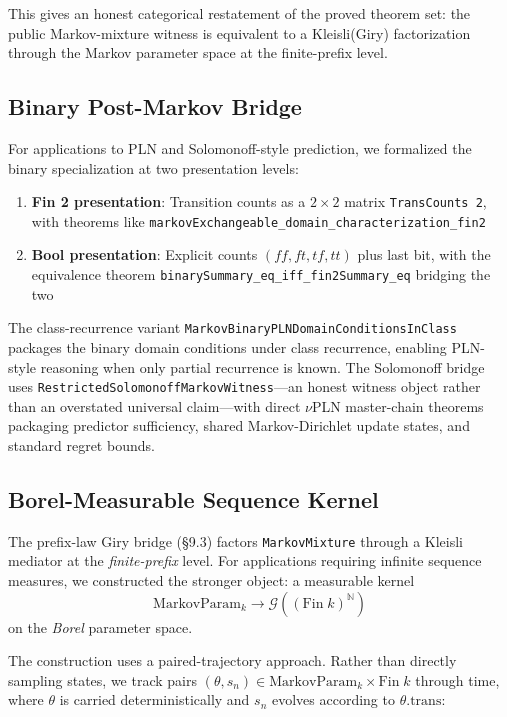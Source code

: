 \documentclass[11pt,a4paper]{article}
\theoremstyle{definition}
\begin{document}
This gives an honest categorical restatement of the proved theorem set:
the public Markov-mixture witness is equivalent to a Kleisli(Giry)
factorization through the Markov parameter space at the finite-prefix level.

\subsection{Binary Post-Markov Bridge}

For applications to PLN and Solomonoff-style prediction, we formalized the
binary specialization at two presentation levels:

\begin{enumerate}
\item \textbf{Fin 2 presentation}: Transition counts as a $2 \times 2$ matrix
  \texttt{TransCounts 2}, with theorems like
  \texttt{markovExchangeable\_domain\_characterization\_fin2}
\item \textbf{Bool presentation}: Explicit counts $(ff,ft,tf,tt)$ plus last bit,
  with the equivalence theorem
  \texttt{binarySummary\_eq\_iff\_fin2Summary\_eq} bridging the two
\end{enumerate}

The class-recurrence variant \texttt{MarkovBinaryPLNDomainConditionsInClass}
packages the binary domain conditions under class recurrence, enabling
PLN-style reasoning when only partial recurrence is known. The Solomonoff
bridge uses \texttt{RestrictedSolomonoffMarkovWitness}---an honest witness
object rather than an overstated universal claim---with direct $\nu$PLN
master-chain theorems packaging predictor sufficiency, shared Markov-Dirichlet
update states, and standard regret bounds.

\subsection{Borel-Measurable Sequence Kernel}

The prefix-law Giry bridge (\S9.3) factors \texttt{MarkovMixture} through a
Kleisli mediator at the \emph{finite-prefix} level. For applications requiring
infinite sequence measures, we constructed the stronger object: a measurable
kernel
\[
\mathrm{MarkovParam}_k \to \mathcal{G}((\mathrm{Fin}\;k)^{\mathbb{N}})
\]
on the \emph{Borel} parameter space.

The construction uses a paired-trajectory approach. Rather than directly
sampling states, we track pairs $(\theta, s_n) \in \mathrm{MarkovParam}_k
\times \mathrm{Fin}\;k$ through time, where $\theta$ is carried deterministically
and $s_n$ evolves according to $\theta.\mathrm{trans}$:
\end{document}
